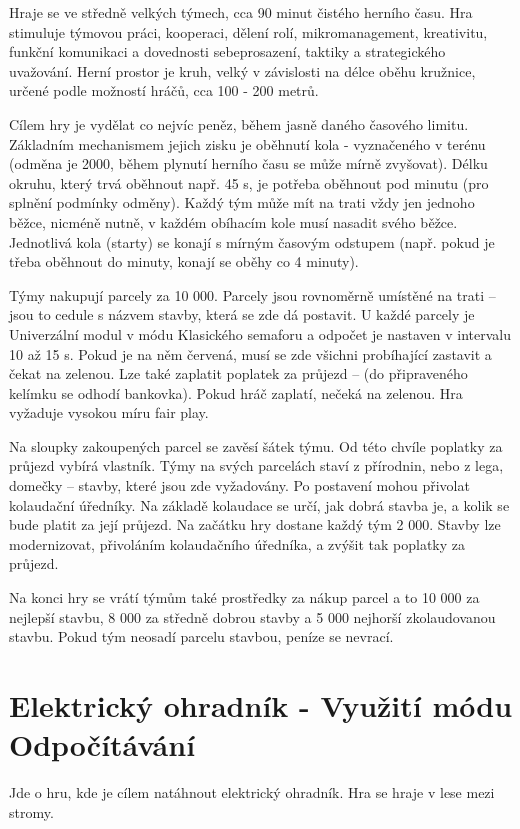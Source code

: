 Hraje se ve středně velkých týmech, cca 90 minut čistého herního času. Hra stimuluje týmovou práci, kooperaci, dělení rolí, mikromanagement, kreativitu, funkční komunikaci a dovednosti sebeprosazení, taktiky a strategického 
uvažování. Herní prostor je kruh, velký v závislosti na délce oběhu kružnice, určené podle možností hráčů, cca 100 - 200 metrů.

Cílem hry je vydělat co nejvíc peněz, během jasně daného časového limitu. Základním mechanismem jejich zisku je oběhnutí kola - vyznačeného v terénu (odměna je 2000, během plynutí herního času se může mírně zvyšovat). Délku 
okruhu, který trvá oběhnout např. 45 s,  je potřeba oběhnout pod minutu (pro splnění podmínky odměny). Každý tým může mít na trati vždy jen jednoho běžce, nicméně nutně, v každém obíhacím kole musí nasadit svého běžce. Jednotlivá 
kola (starty) se konají s mírným časovým odstupem (např. pokud je třeba oběhnout do minuty, konají se oběhy co 4 minuty).

Týmy nakupují parcely za 10 000. Parcely jsou rovnoměrně umístěné na trati – jsou to cedule s názvem stavby, která se zde dá postavit. U každé parcely je Univerzální modul v módu Klasického semaforu a odpočet je nastaven v intervalu 
10 až 15 s. 
Pokud je na něm červená, musí se zde všichni probíhající zastavit a čekat na zelenou. Lze také zaplatit poplatek za průjezd – (do připraveného kelímku se odhodí bankovka). Pokud hráč zaplatí, nečeká na zelenou. Hra vyžaduje vysokou 
míru fair play. 

Na sloupky zakoupených parcel se zavěsí šátek týmu. Od této chvíle poplatky za průjezd vybírá vlastník. Týmy na svých parcelách staví z přírodnin, nebo z lega, domečky – stavby, které jsou zde vyžadovány. Po postavení mohou přivolat 
kolaudační 
úředníky. Na základě kolaudace se určí, jak dobrá stavba je, a kolik se bude platit za její průjezd. Na začátku hry dostane každý tým 2 000. Stavby lze modernizovat, přivoláním kolaudačního úředníka, a zvýšit tak poplatky za průjezd. 

Na konci hry se vrátí týmům také prostředky za nákup parcel a to 10 000 za nejlepší stavbu, 8 000 za středně dobrou stavby a 5 000 nejhorší zkolaudovanou stavbu. Pokud tým neosadí parcelu stavbou, peníze se nevrací. 


\newpage
\section{Elektrický ohradník - Využití módu Odpočítávání}
Jde o hru, kde je cílem natáhnout elektrický ohradník. Hra se hraje v lese mezi stromy.

